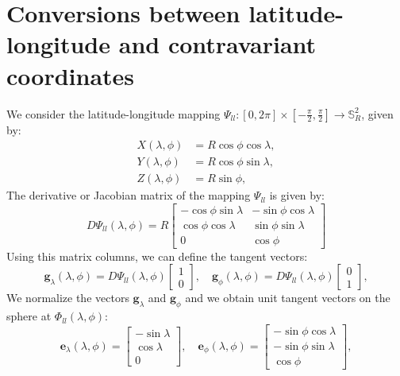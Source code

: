\section{Conversions between latitude-longitude  
and contravariant coordinates}
\label{anexo-sph-ll}
We consider the latitude-longitude mapping 
$\Psi_{ll}: [0,2\pi] \times [-\frac{\pi}{2},\frac{\pi}{2}] \to \mathbb{S}^2_R$, given by:
\begin{align}
	\label{ll2sph}
	X(\lambda,\phi) &= R\cos \phi \cos \lambda,\\
	Y(\lambda,\phi) &= R\cos \phi \sin \lambda,\\
	Z(\lambda,\phi) &= R\sin \phi,
\end{align}
The derivative or Jacobian matrix of the mapping $\Psi_{ll}$ is given by:
\begin{equation}
	\label{dpsi}
	D\Psi_{ll} (\lambda,\phi) = 
	R \begin{bmatrix}
		  -\cos \phi \sin \lambda &  -\sin \phi \cos \lambda \\
		   \cos \phi \cos \lambda & \sin \phi \sin \lambda \\
		  0  &  \cos \phi
	\end{bmatrix}
\end{equation}
Using this matrix columns, we can define the tangent vectors:
\begin{equation}
	\boldsymbol{g}_{\lambda}(\lambda,\phi) = D\Psi_{ll}(\lambda,\phi)
	\begin{bmatrix}
		 1 \\
		 0
	\end{bmatrix}, \quad
	\boldsymbol{g}_{\phi}(\lambda,\phi) = D\Psi_{ll}(\lambda,\phi)
	\begin{bmatrix}
		 0 \\
		 1
	\end{bmatrix},
\end{equation}
We normalize the vectors $\boldsymbol{g}_\lambda$ and $\boldsymbol{g}_\phi$
and we obtain unit tangent vectors on the sphere at $\Phi_{ll}(\lambda, \phi)$:
\begin{equation}
	\label{latlon_tg_vectors}
	\boldsymbol{e}_{\lambda}(\lambda,\phi) = 
	\begin{bmatrix}
		 -\sin \lambda \\
		  \cos \lambda \\
		  0
	\end{bmatrix}, \quad
	\boldsymbol{e}_{\phi}(\lambda,\phi) =
	\begin{bmatrix}
		 -\sin \phi \cos \lambda \\
		 -\sin \phi \sin \lambda \\
			  \cos \phi
	\end{bmatrix},
\end{equation}


